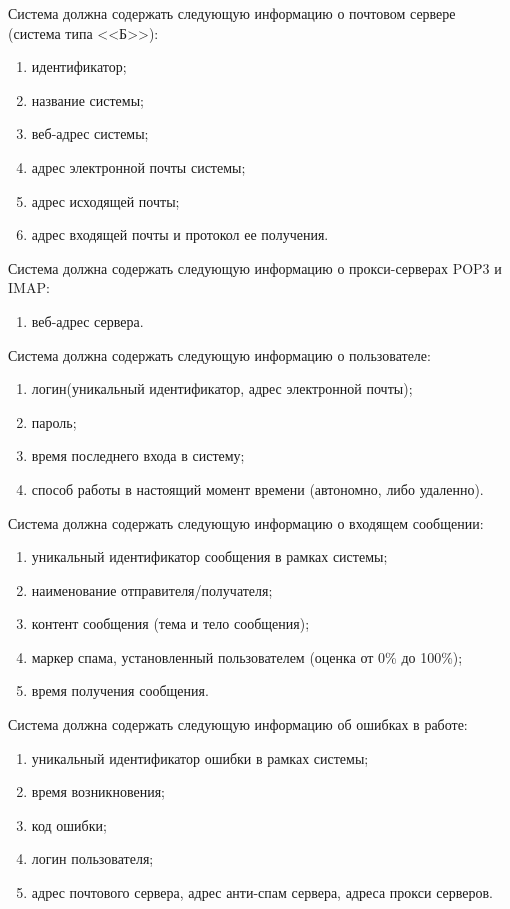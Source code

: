 Система должна содержать следующую информацию о почтовом сервере (система типа <<Б>>):
\begin{enumerate}
	\item идентификатор;
	\item название системы;
	\item веб-адрес системы;
	\item адрес электронной почты системы;
	\item адрес исходящей почты;
	\item адрес входящей почты и протокол ее получения.
\end{enumerate}

Система должна содержать следующую информацию о прокси-серверах POP3 и IMAP:
\begin{enumerate}
	\item веб-адрес сервера.
\end{enumerate}

Система должна содержать следующую информацию о пользователе:
\begin{enumerate}
	\item логин(уникальный идентификатор, адрес электронной почты);
	\item пароль;
	\item время последнего входа в систему;
	\item способ работы в настоящий момент времени (автономно, либо удаленно).
\end{enumerate}

Система должна содержать следующую информацию о входящем сообщении:
\begin{enumerate}
	\item уникальный идентификатор сообщения в рамках системы;
	\item наименование отправителя/получателя;
	\item контент сообщения (тема и тело сообщения);
	\item маркер спама, установленный пользователем (оценка от 0\% до 100\%);
	\item время получения сообщения.
\end{enumerate}

Система должна содержать следующую информацию об ошибках в работе:
\begin{enumerate}
	\item уникальный идентификатор ошибки в рамках системы;
	\item время возникновения;
	\item код ошибки;
	\item логин пользователя;
	\item адрес почтового сервера, адрес анти-спам сервера, адреса прокси серверов.
\end{enumerate}

